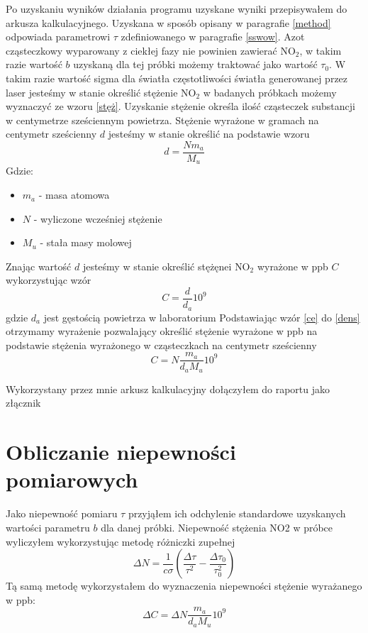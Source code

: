\documentclass[10pt,a4paper]{article}
\begin{document}
Po uzyskaniu wyników działania programu uzyskane wyniki przepisywałem do arkusza kalkulacyjnego. Uzyskana w sposób opisany w paragrafie \ref{method} odpowiada parametrowi $\tau$ zdefiniowanego w paragrafie \ref{sswow}. Azot cząsteczkowy wyparowany z ciekłej fazy nie powinien zawierać $\text{NO}_{\text{2}}$, w takim razie wartość $b$ uzyskaną dla tej próbki możemy traktować jako wartość $\tau_0$. W takim razie wartość sigma dla światła częstotliwości  światła generowanej przez laser jesteśmy w stanie określić stężenie $\text{NO}_{\text{2}}$ w badanych próbkach możemy wyznaczyć ze wzoru \ref{stęż}.  Uzyskanie stężenie określa ilość cząsteczek substancji w centymetrze sześciennym powietrza.  
Stężenie wyrażone w gramach na centymetr sześcienny $d$ jesteśmy w stanie określić na podstawie wzoru
\begin{equation}
    \label{dens}
    d = \frac{N m_a}{M_u}
\end{equation}
Gdzie:
\begin{itemize}
    \item $m_a$ - masa atomowa
    \item $N$ - wyliczone wcześniej stężenie
    \item $M_u$ - stała masy molowej
\end{itemize}
 Znając wartość $d$ jesteśmy w stanie określić stężęnei $\text{NO}_{\text{2}}$ wyrażone w ppb $C$ wykorzystując wzór
\begin{equation}
    \label{ce}
    C=\frac{d}{d_a} 10^9
\end{equation}
gdzie $d_a$ jest gęstością powietrza w laboratorium
Podstawiając wzór \ref{ce} do \ref{dens} otrzymamy wyrażenie pozwalający określić stężenie wyrażone w ppb na podstawie stężenia wyrażonego w cząsteczkach na centymetr sześcienny
\begin{equation}
    \label{cer}
    C = N \frac{m_a}{d_a M_u}10^9
\end{equation}

Wykorzystany przez mnie arkusz kalkulacyjny dołączyłem do raportu jako złącznik


\section{Obliczanie niepewności pomiarowych}

Jako niepewność pomiaru $\tau$ przyjąłem ich odchylenie standardowe uzyskanych wartości parametru $b$ dla danej próbki. Niepewność stężenia NO2 w próbce wyliczyłem wykorzystując metodę różniczki zupełnej
\begin{equation}
    \label{niept}
    \Delta N = \frac{1}{c \sigma} \left(\frac{\Delta \tau}{\tau^2} - \frac{\Delta \tau_0}{\tau_0^2} \right)
\end{equation}
Tą samą metodę wykorzystałem do wyznaczenia niepewności stężenie wyrażanego w ppb:
\begin{equation}
    \label{niepn}
    \Delta C = \Delta N \frac{m_a}{d_a M_u}10^9
\end{equation}
\end{document}
